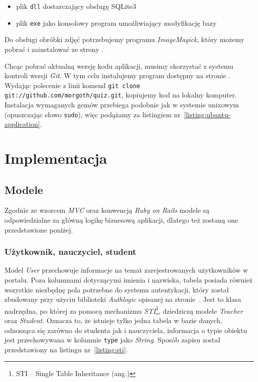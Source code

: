 \documentclass[12pt,twoside]{report}
\begin{document}
\begin{itemize}
  \item{plik \texttt{dll} dostarczający obsługę SQLite3}
  \item{plik \texttt{exe} jako konsolowy program umożliwiający modyfikację bazy}
\end{itemize}


Do obsługi obróbki zdjęć potrzebujemy programu \emph{ImageMagick}, który możemy pobrać i
zainstalować ze strony \cite{imagemagick-windows}.


Chcąc pobrać aktualną wersję kodu aplikacji, musimy skorzystać z systemu kontroli wersji
\emph{Git}. W tym celu instalujemy program dostępny na stronie \cite{git-windows}.
Wydając polecenie z linii komend \texttt{git~clone git://github.com/morgoth/quiz.git},
kopiujemy kod na lokalny komputer. Instalacja wymaganych gemów przebiega podobnie jak w
systemie unixowym (opuszczając słowo \texttt{sudo}), więc podążamy za listingiem
nr~\ref{listing:ubuntu-application}.


\cleardoublepage
\chapter{Implementacja}
\section{Modele}
Zgodnie ze wzorcem \emph{MVC} oraz konwencją \emph{Ruby on Rails} modele są odpowiedzialne
za główną logikę biznesową aplikacji, dlatego też zostaną one przedstawione poniżej.

\subsection{Użytkownik, nauczyciel, student}
Model \emph{User} przechowuje informacje na temat zarejestrowanych użytkowników w
portalu. Poza kolumnami dotyczącymi imienia i nazwiska, tabela posiada również wszystkie
niezbędnę pola potrzebne do systemu autentykacji, który został zbudowany przy użyciu
biblioteki \emph{Authlogic} opisanej na stronie~\pageref{sec:authlogic}. Jest to klasa
nadrzędna, po której za pomocą mechanizmu \emph{STI}\footnote{STI -- Single Table
Inheritance (ang.)}, dziedziczą modele \emph{Teacher} oraz \emph{Student}. Oznacza to, że
istnieje tylko jedna tabela w bazie danych, odnosząca się zarówno do studenta jak i
nauczyciela, informacja o typie obiektu jest przechowywana w kolumnie \texttt{type} jako
\emph{String}. Sposób zapisu został przedstawiony na listingu nr~\ref{listing:sti}.
\end{document}
